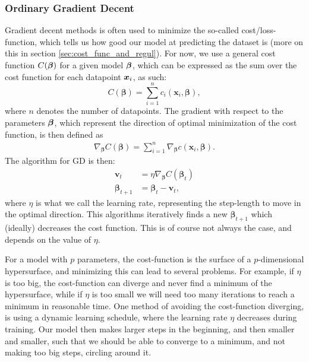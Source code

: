 \documentclass[12pt]{extarticle}
\begin{document}
\subsubsection{Ordinary Gradient Decent}
Gradient decent methods is often used to minimize the so-called cost/loss-function, which tells us how good our model at predicting the dataset is (more on this in section \ref{sec:cost_func_and_regul}). For now, we use a general cost function $C(\boldsymbol{\beta})$ for a given model $\boldsymbol{\beta}$, which can be expressed as the sum over the cost function for each datapoint $\boldsymbol x_i$, as such:
\begin{equation}
	C(\boldsymbol{\beta}) = \sum_{i = 1}^{n}c_i(\mathbf{x}_i, \boldsymbol{\beta}),
\end{equation}
where $n$ denotes the number of datapoints. The gradient with respect to the parameters $\boldsymbol{\beta}$, which represent the direction of optimal minimization of the cost function,  is then defined as
\begin{align}
	\nabla_{\boldsymbol{\beta}} C(\boldsymbol{\beta}) = \sum_{i = 1}^{n} \nabla_{\boldsymbol{\beta}} c(\mathbf{x}_i, \boldsymbol{\beta}).
	\label{eq:Total_gradient}
\end{align}
The algorithm for GD is then:
\begin{align}
	\mathbf{v}_t             & = \eta \nabla_{\boldsymbol{\beta}} C(\boldsymbol{\beta}_t) \nonumber \\
	\boldsymbol{\beta}_{t+1} & = \boldsymbol{\beta}_t - \mathbf{v}_t,
	\label{eq:GD_algo}
\end{align}
where $\eta$ is what we call the learning rate, representing the step-length to move in the optimal direction.  This algorithms iteratively finds a new $\boldsymbol{\beta}_{t+1}$ which (ideally) decreases the cost function. This is of course not always the case, and depends on the value of $\eta$.

For a model with $p$ parameters, the cost-function is the surface of a $p$-dimensional hypersurface, and minimizing this can lead to several problems. For example, if $\eta$  is too big, the cost-function can diverge and never find a minimum of the hypersurface, while if $\eta$ is too small we will need too many iterations to reach a minimum in reasonable time. One method of avoiding the cost-function diverging, is using a dynamic learning schedule, where the learning rate $\eta$ decreases during training. Our model then makes larger steps in the beginning, and then smaller and smaller, such that we should be able to converge to a minimum, and not making too big steps, circling around it.
\end{document}
